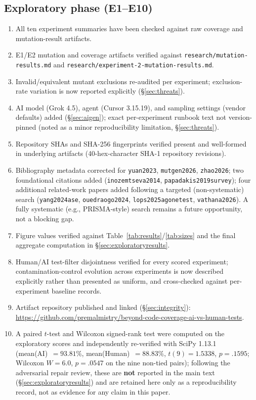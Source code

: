\documentclass[10pt,conference]{IEEEtran}
\begin{document}
\subsection{Exploratory phase (E1--E10)}
\begin{enumerate}
\item All ten experiment summaries have been checked against raw coverage and mutation-result artifacts.
\item E1/E2 mutation and coverage artifacts verified against \texttt{research/mutation-results.md} and \texttt{research/experiment-2-mutation-results.md}.
\item Invalid/equivalent mutant exclusions re-audited per experiment; exclusion-rate variation is now reported explicitly (\S\ref{sec:threats}).
\item AI model (Grok 4.5), agent (Cursor 3.15.19), and sampling settings (vendor defaults) added (\S\ref{sec:aigen}); exact per-experiment runbook text not version-pinned (noted as a minor reproducibility limitation, \S\ref{sec:threats}).
\item Repository SHAs and SHA-256 fingerprints verified present and well-formed in underlying artifacts (40-hex-character SHA-1 repository revisions).
\item Bibliography metadata corrected for \texttt{yuan2023}, \texttt{mutgen2026}, \texttt{zhao2026}; two foundational citations added (\texttt{inozemtseva2014}, \texttt{papadakis2019survey}); four additional related-work papers added following a targeted (non-systematic) search (\texttt{yang2024ase}, \texttt{ouedraogo2024}, \texttt{lops2025agonetest}, \texttt{vathana2026}). A fully systematic (e.g., PRISMA-style) search remains a future opportunity, not a blocking gap.
\item Figure values verified against Table~\ref{tab:results}/\ref{tab:sizes} and the final aggregate computation in \S\ref{sec:exploratoryresults}.
\item Human/AI test-filter disjointness verified for every scored experiment; contamination-control evolution across experiments is now described explicitly rather than presented as uniform, and cross-checked against per-experiment baseline records.
\item Artifact repository published and linked (\S\ref{sec:integrity}): \url{https://github.com/premalmistry/beyond-code-coverage-ai-vs-human-tests}.
\item A paired $t$-test and Wilcoxon signed-rank test were computed on the exploratory scores and independently re-verified with SciPy 1.13.1 (mean(AI)~$=93.81\%$, mean(Human)~$=88.83\%$, $t(9)=1.5338$, $p=.1595$; Wilcoxon $W=6.0$, $p=.0547$ on the nine non-tied pairs); following the adversarial repair review, these are \textbf{not} reported in the main text (\S\ref{sec:exploratoryresults}) and are retained here only as a reproducibility record, not as evidence for any claim in this paper.
\end{enumerate}
\end{document}
